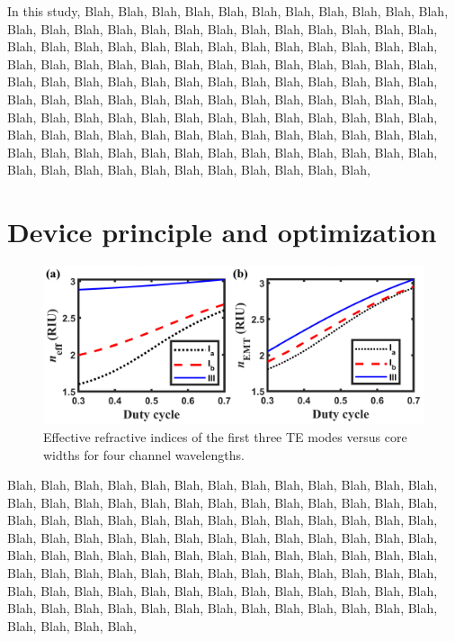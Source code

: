 \documentclass[lettersize,journal]{IEEEtran}
\def\ur#1{{\color{ured}#1}}
\begin{document}
    In this \ur{study}, 
    Blah, Blah, Blah, Blah, Blah, Blah, Blah, Blah, Blah, Blah, Blah, Blah, Blah, Blah, Blah, Blah, Blah, Blah, 
    Blah, Blah, Blah, Blah, Blah, Blah, Blah, Blah, Blah, Blah, Blah, Blah, Blah, Blah, Blah, Blah, Blah, Blah, 
    Blah, Blah, Blah, Blah, Blah, Blah, Blah, Blah, Blah, Blah, Blah, Blah, Blah, Blah, Blah, Blah, Blah, Blah, 
    Blah, Blah, Blah, Blah, Blah, Blah, Blah, Blah, Blah, Blah, Blah, Blah, Blah, Blah, Blah, Blah, Blah, Blah, 
    Blah, Blah, Blah, Blah, Blah, Blah, Blah, Blah, Blah, Blah, Blah, Blah, Blah, Blah, Blah, Blah, Blah, Blah, 
    Blah, Blah, Blah, Blah, Blah, Blah, Blah, Blah, Blah, Blah, Blah, Blah, Blah, Blah, Blah, Blah, Blah, Blah, 
    Blah, Blah, Blah, Blah, Blah, Blah, Blah, Blah, Blah, Blah, Blah, Blah, Blah, Blah, Blah, Blah, Blah, Blah, 


\section{Device principle and optimization}
\label{sec:two}
    \begin{figure}[!t]
		\includegraphics{Fig_sample.pdf}
		\centering
		\caption{\label{fig:vb}Effective refractive indices of the first three TE modes versus core widths for four channel wavelengths.}
	\end{figure}
	Blah, Blah, Blah, Blah, Blah, Blah, Blah, Blah, Blah, Blah, Blah, Blah, Blah, Blah, Blah, Blah, Blah, Blah, 
    Blah, Blah, Blah, Blah, Blah, Blah, Blah, Blah, Blah, Blah, Blah, Blah, Blah, Blah, Blah, Blah, Blah, Blah, 
    Blah, Blah, Blah, Blah, Blah, Blah, Blah, Blah, Blah, Blah, Blah, Blah, Blah, Blah, Blah, Blah, Blah, Blah, 
    Blah, Blah, Blah, Blah, Blah, Blah, Blah, Blah, Blah, Blah, Blah, Blah, Blah, Blah, Blah, Blah, Blah, Blah, 
    Blah, Blah, Blah, Blah, Blah, Blah, Blah, Blah, Blah, Blah, Blah, Blah, Blah, Blah, Blah, Blah, Blah, Blah, 
    Blah, Blah, Blah, Blah, Blah, Blah, Blah, Blah, Blah, Blah, Blah, Blah, Blah, Blah, Blah, Blah, Blah, Blah, 
\end{document}
